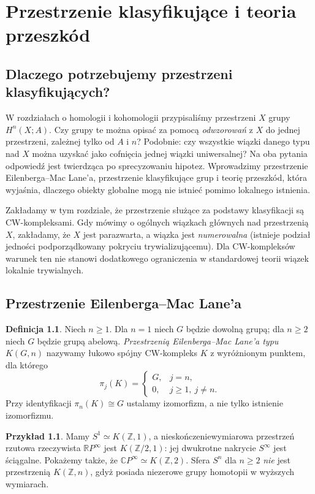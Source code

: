 \documentclass[11pt,a4paper,oneside]{report}
\newcommand{\R}{\mathbb{R}}
\newcommand{\C}{\mathbb{C}}
\newcommand{\Z}{\mathbb{Z}}
\theoremstyle{plain}
\theoremstyle{definition}
\newtheorem{definicja}[twierdzenie]{Definicja}
\newtheorem{przyklad}[twierdzenie]{Przykład}
\theoremstyle{remark}
\begin{document}
\chapter{Przestrzenie klasyfikujące i teoria przeszkód}
\label{ch:klasyfikacja-v6}

\section{Dlaczego potrzebujemy przestrzeni klasyfikujących?}
W rozdziałach o homologii i kohomologii przypisaliśmy przestrzeni $X$
grupy $H^n(X;A)$. Czy grupy te można opisać za pomocą
\emph{odwzorowań} z $X$ do jednej przestrzeni, zależnej tylko od
$A$ i $n$? Podobnie: czy wszystkie wiązki danego typu nad $X$
można uzyskać jako cofnięcia jednej wiązki uniwersalnej?
Na oba pytania odpowiedź jest twierdząca po sprecyzowaniu
hipotez. Wprowadzimy przestrzenie Eilenberga--Mac Lane'a,
przestrzenie klasyfikujące grup i teorię przeszkód, która
wyjaśnia, dlaczego obiekty globalne mogą nie istnieć
pomimo lokalnego istnienia.

Zakładamy w tym rozdziale, że przestrzenie służące za
podstawy klasyfikacji są CW-kompleksami. Gdy mówimy
o ogólnych wiązkach głównych nad przestrzenią $X$,
zakładamy, że $X$ jest parazwarta, a wiązka jest
\emph{numerowalna} (istnieje podział jedności podporządkowany
pokryciu trywializującemu). Dla CW-kompleksów
warunek ten nie stanowi dodatkowego ograniczenia
w standardowej teorii wiązek lokalnie trywialnych.

\section{Przestrzenie Eilenberga--Mac Lane'a}
\begin{definicja}
Niech $n\ge1$. Dla $n=1$ niech $G$ będzie dowolną grupą;
dla $n\ge2$ niech $G$ będzie grupą abelową.
\emph{Przestrzenią Eilenberga--Mac Lane'a typu $K(G,n)$}
nazywamy łukowo spójny CW-kompleks $K$ z wyróżnionym
punktem, dla którego
\[
\pi_j(K)=\begin{cases}G,&j=n,\\0,&j\ge1,\ j\ne n.
\end{cases}
\]
Przy identyfikacji $\pi_n(K)\cong G$ ustalamy
izomorfizm, a nie tylko istnienie izomorfizmu.
\end{definicja}
\begin{przyklad}
Mamy $S^1\simeq K(\Z,1)$, a nieskończeniewymiarowa
przestrzeń rzutowa rzeczywista $\R P^\infty$ jest
$K(\Z/2,1)$: jej dwukrotne nakrycie $S^\infty$
jest ściągalne. Pokażemy także, że
$\C P^\infty\simeq K(\Z,2)$.
Sfera $S^n$ dla $n\ge2$ \emph{nie} jest przestrzenią
$K(\Z,n)$, gdyż posiada niezerowe grupy homotopii
w wyższych wymiarach.
\end{przyklad}
\end{document}

